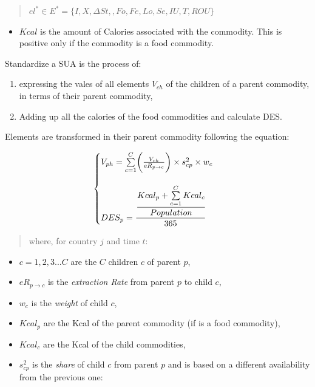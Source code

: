 \documentclass[]{article}
\providecommand{\tightlist}{%
  \setlength{\itemsep}{0pt}\setlength{\parskip}{0pt}}
\begin{document}
\begin{quote}
\(el^{*} \in E^{*} = \{I,X,\Delta St, ,Fo,Fe,Lo,Se,IU,T,ROU\}\)
\end{quote}

\begin{itemize}
\tightlist
\item
  \(Kcal\) is the amount of Calories associated with the commodity. This
  is positive only if the commodity is a food commodity.
\end{itemize}

Standardize a SUA is the process of:

\begin{enumerate}
\def\labelenumi{\alph{enumi}.}
\tightlist
\item
  expressing the vales of all elements \(V_{ch}\) of the children of a
  parent commodity, in terms of their parent commodity,
\item
  Adding up all the calories of the food commodities and calculate DES.
\end{enumerate}

Elements are transformed in their parent commodity following the
equation:

\begin{equation}
\begin{cases}
\label{eq:Food Processing}
 V_{ph} = \sum \limits_{c=1}^C\biggl(\frac{V_{ch}}{eR_{p\to c}}\biggr)\times s^{2}_{cp}\times w_{c}\\
  \\
 DES_{p} =  \cfrac{\cfrac{Kcal_{p} + \sum \limits_{c=1}^C Kcal_{c}}{Population}}{365}
\end{cases}
\end{equation}

\begin{quote}
where, for country \(j\) and time \(t\):
\end{quote}

\begin{itemize}
\tightlist
\item
  \(c = 1,2,3...C\) are the \(C\) children \(c\) of parent \(p\),
\item
  \(eR_{p\to c}\) is the \emph{extraction Rate} from parent \(p\) to
  child \(c\),
\item
  \(w_{c}\) is the \emph{weight} of child \(c\),
\item
  \(Kcal_{p}\) are the Kcal of the parent commodity (if is a food
  commodity),
\item
  \(Kcal_{c}\) are the Kcal of the child commodities,
\item
  \(s^{2}_{cp}\) is the \emph{share} of child \(c\) from parent \(p\)
  and is based on a different availability from the previous one:
\end{itemize}
\end{document}
